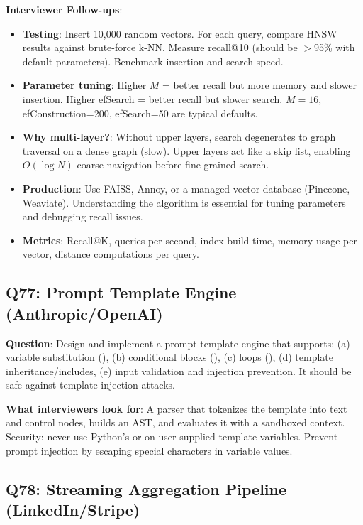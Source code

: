 \textbf{Interviewer Follow-ups}:
\begin{itemize}[leftmargin=*]
    \item \textbf{Testing}: Insert 10,000 random vectors. For each query, compare HNSW results against brute-force k-NN. Measure recall@10 (should be $>$95\% with default parameters). Benchmark insertion and search speed.
    \item \textbf{Parameter tuning}: Higher $M$ = better recall but more memory and slower insertion. Higher efSearch = better recall but slower search. $M=16$, efConstruction=200, efSearch=50 are typical defaults.
    \item \textbf{Why multi-layer?}: Without upper layers, search degenerates to graph traversal on a dense graph (slow). Upper layers act like a skip list, enabling $O(\log N)$ coarse navigation before fine-grained search.
    \item \textbf{Production}: Use FAISS, Annoy, or a managed vector database (Pinecone, Weaviate). Understanding the algorithm is essential for tuning parameters and debugging recall issues.
    \item \textbf{Metrics}: Recall@K, queries per second, index build time, memory usage per vector, distance computations per query.
\end{itemize}

\subsection{Q77: Prompt Template Engine (Anthropic/OpenAI)}

\textbf{Question}: Design and implement a prompt template engine that supports: (a) variable substitution (), (b) conditional blocks (), (c) loops (), (d) template inheritance/includes, (e) input validation and injection prevention. It should be safe against template injection attacks.

\textbf{What interviewers look for}: A parser that tokenizes the template into text and control nodes, builds an AST, and evaluates it with a sandboxed context. Security: never use Python's  or  on user-supplied template variables. Prevent prompt injection by escaping special characters in variable values.

\subsection{Q78: Streaming Aggregation Pipeline (LinkedIn/Stripe)}

